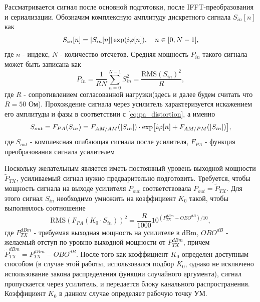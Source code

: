 Рассматривается сигнал после основной подготовки, после IFFT-преобразования
и сериализации. Обозначим комплексную амплитуду дискретного сигнала
$S_{in}[n]$ как
\begin{equation}
    S_{in}[n] = \abs{S_{in}[n]}\exp(i\varphi[n]),\quad n \in[0, N-1],
\end{equation}
где $n$ - индекс, $N$ - количество отсчетов. Средняя мощность
$P_{in}$ такого сигнала может быть записана как 
\begin{equation}
    P_{in} = \frac{1}{RN}\sum_{n=0}^{N-1}S^2_{in} = \frac{\text{RMS}(S_{in})^2}{R},
\end{equation}
где $R$ - сопротивлением согласованной нагрузки(здесь и далее будем считать
что $R=50$ Ом). Прохождение сигнала через усилитель характеризуется
искажением его амплитуды и фазы в соответствии с \ref{eq:pa_distortion}, а именно
\begin{equation}
    S_{out} = F_{PA}(S_{in}) = F_{AM/AM}(\abs{S_{in}}) \cdot \exp[i \varphi[n] + F_{AM/PM}(\abs{S_{in}})],
\end{equation}
где $S_{out}$ - комплексная огибающая сигнала после усилителя, $F_{PA}$ -
функция преобразования сигнала усилителем

Поскольку желательным является иметь постоянный уровень
выходной мощности $\tilde{P}_{TX}$, усиливаемый сигнал нужно
предварительно подготовить. Требуется, чтобы мощность сигнала на выходе
усилителя $P_{out}$ соответствовала $P_{out} = \tilde{P}_{TX}$.
Для этого сигнал $S_{in}$ необходимо умножить на коэффициент $K_0$ такой,
чтобы выполнялось соотношение
\begin{equation}
    \displaystyle
    \text{RMS}(F_{PA}(K_0 \cdot S_{in}))^2 = \frac{R}{1000} 10^{\left(P^{dBm}_{TX} - OBO^{dB}\right)/10},
\end{equation}
где $P^{dBm}_{TX}$ - требуемая выходная мощность на усилителе в dBm,
$OBO^{dB}$ - желаемый отступ по уровню выходной мощности от $P^{dBm}_{TX}$,
причем $\tilde{P}^{dBm}_{TX} = P^{dBm}_{TX} - OBO^{dB}$.
После того как коэффициент $K_0$ определен доступным способом (в случае
этой работы, использовался подбор $K_0$, однако не исключено использование
закона распределения функции случайного аргумента), сигнал пропускается
через усилитель, и передается блоку канального распространения. Коэффициент
$K_0$ в данном случае определяет рабочую точку УМ.


